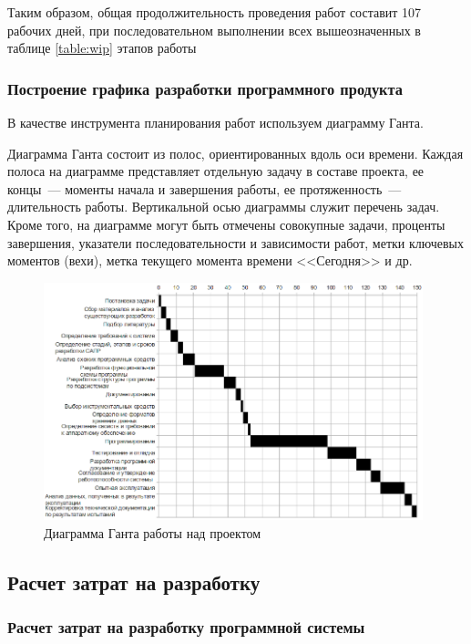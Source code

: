 Таким образом, общая продолжительность проведения работ составит 107 рабочих дней, при последовательном выполнении всех вышеозначенных в таблице \ref{table:wip} этапов работы

\subsubsection{Построение графика разработки программного продукта}
В качестве инструмента планирования работ используем диаграмму Ганта.

Диаграмма Ганта состоит из полос, ориентированных вдоль оси времени.
Каждая полоса на диаграмме представляет отдельную задачу в составе проекта, ее концы~--- моменты начала и завершения работы, ее протяженность~--- длительность работы.
Вертикальной осью диаграммы служит перечень задач.
Кроме того, на диаграмме могут быть отмечены совокупные задачи, проценты завершения, указатели последовательности и зависимости работ, метки ключевых моментов (вехи), метка текущего момента времени <<Сегодня>> и др.

\begin{figure}[H]
  \centering
  \includegraphics[width=0.98\textwidth]{diagrams/gantt.png}
  \caption{Диаграмма Ганта работы над проектом}
\end{figure}

\subsection{Расчет затрат на разработку} \label{sec:money-1}
\subsubsection{Расчет затрат на разработку программной системы}

